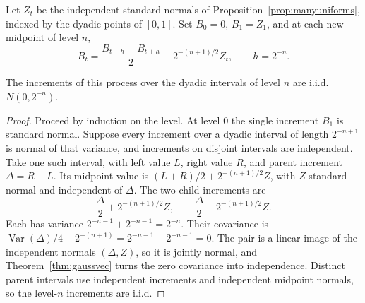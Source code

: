 Let $Z_t$ be the independent standard normals of Proposition~\ref{prop:manyuniforms}, indexed by the dyadic points of $[0,1]$. Set $B_0=0$, $B_1=Z_1$, and at each new midpoint of level $n$,
\[
 B_t=\frac{B_{t-h}+B_{t+h}}{2}+2^{-(n+1)/2}Z_t,\qquad h=2^{-n}.
\]

\begin{lemma}\label{lem:levylevel}
The increments of this process over the dyadic intervals of level $n$ are i.i.d.\ $N(0,2^{-n})$.
\end{lemma}
\begin{proof}
Proceed by induction on the level. At level $0$ the single increment $B_1$ is standard normal. Suppose every increment over a dyadic interval of length $2^{-n+1}$ is normal of that variance, and increments on disjoint intervals are independent. Take one such interval, with left value $L$, right value $R$, and parent increment $\Delta=R-L$. Its midpoint value is $(L+R)/2+2^{-(n+1)/2}Z$, with $Z$ standard normal and independent of $\Delta$. The two child increments are
\[
 \frac\Delta2+2^{-(n+1)/2}Z,\qquad \frac\Delta2-2^{-(n+1)/2}Z.
\]
Each has variance $2^{-n-1}+2^{-n-1}=2^{-n}$. Their covariance is $\operatorname{Var}(\Delta)/4-2^{-(n+1)}=2^{-n-1}-2^{-n-1}=0$. The pair is a linear image of the independent normals $(\Delta,Z)$, so it is jointly normal, and Theorem~\ref{thm:gaussvec} turns the zero covariance into independence. Distinct parent intervals use independent increments and independent midpoint normals, so the level-$n$ increments are i.i.d.
\end{proof}


